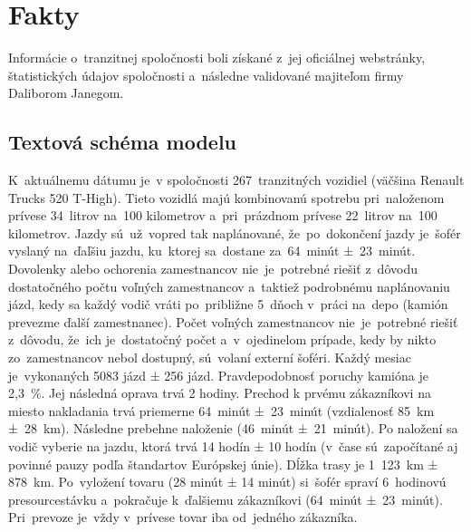 \documentclass[a4paper, 11pt]{article}
\begin{document}
    \newpage
	\section{Fakty}
	Informácie o~tranzitnej spoločnosti boli získané z~jej oficiálnej
    webstránky, štatistických údajov spoločnosti a~následne validované
    majiteľom firmy Daliborom Janegom. 

    \subsection{Textová schéma modelu}
    K~aktuálnemu dátumu je~v spoločnosti
    267~tranzitných vozidiel (väčšina Renault Trucks
    520 T-High). Tieto vozidlá majú kombinovanú spotrebu pri~naloženom prívese
    34~litrov na~100 kilometrov a~pri~prázdnom prívese 22~litrov
    na~100 kilometrov.\newline
    Jazdy sú~už~vopred tak naplánované, že~po~dokončení jazdy je~šofér
    vyslaný na~ďaľšiu jazdu, ku~ktorej sa~dostane
    za~64~minút ±~23~minút.
    Dovolenky alebo ochorenia zamestnancov nie~je~potrebné riešiť
    z~dôvodu dostatočného počtu voľných zamestnancov a~taktiež
    podrobnému naplánovaniu jázd, kedy sa každý vodič vráti po~približne
    5~dňoch v~práci na~depo (kamión prevezme ďalší zamestnanec). Počet
    voľných zamestnancov nie~je~potrebné riešiť z~dôvodu, že~ich 
    je~dostatočný počet a~v~ojedinelom prípade, kedy by nikto zo~zamestnancov
    nebol dostupný, sú~volaní externí šoféri. Každý mesiac
    je~vykonaných 5083 jázd  ± 256 jázd. Pravdepodobnosť poruchy
    kamióna je 2,3~\%. Jej následná oprava trvá 2 hodiny.\newline
    Prechod k prvému zákazníkovi na miesto nakladania trvá priemerne 
    64~minút ±~23~minút (vzdialenosť 85~km ±~28~km). Následne prebehne naloženie (46~minút ±~21~minút).
    Po naložení sa vodič vyberie na jazdu, ktorá trvá 14 hodín ± 10 hodín
    (v~čase sú~započítané aj povinné pauzy podľa štandartov Európskej
    únie). Dĺžka trasy je 1~123~km  ± 878~km.
    Po~vyložení tovaru (28 minút ± 14 minút) si~šofér spraví 6~hodinovú presourcestávku
    a~pokračuje k~ďalšiemu zákazníkovi (64~minút ±~23~minút). Pri~prevoze je~vždy v~prívese
    tovar iba od~jedného zákazníka.\newline
\end{document}
